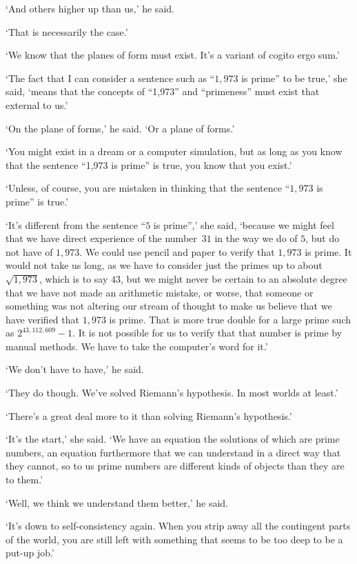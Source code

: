 `And others higher up than us,' he said.

`That is necessarily the case.'

`We know that the planes of form must exist. It's a variant of {\twelveit cogito ergo sum}.'

`The fact that I can consider a sentence such as ``$1,973$ is prime'' to be true,' she said, `means that the concepts of ``1,973'' and ``primeness'' must exist that external to us.'

`On the plane of forms,' he said. `Or {\twelveit a\/} plane of forms.'

`You might exist in a dream or a computer simulation, but as long as you {\twelveit know\/} that the sentence ``1,973 is prime'' is true, you {\twelveit know\/} that you exist.'

`Unless, of course, you are mistaken in thinking that the sentence ``$1,973$ is prime'' is true.'

`It's different from the sentence ``$5$ is prime'',' she said, `because we might feel that we have direct experience of the number~$31$ in the way we do of $5$, but do not have of $1,973$. We could use pencil and paper to verify that $1,973$ is prime. It would not take us long, as we have to consider just the primes up to about $\sqrt{1,973}$, which is to say $43$, but we might never be certain to an {\twelveit absolute\/} degree that we have not made an arithmetic mistake, or worse, that someone or something was not altering our stream of thought to make us believe that we have verified that $1,973$ is prime. That is more true double for a large prime such as $2^{43,112,609} − 1$. It is not possible for us to verify that that number is prime by manual methods. We have to take the computer's word for it.'

`{\twelveit We\/} don't have to have,' he said.

`They do though. We've solved Riemann's hypothesis. In most worlds at least.'

`There's a great deal more to it than solving Riemann's hypothesis.'

`It's the start,' she said. `We have an equation the solutions of which are prime numbers, an equation furthermore that {\twelveit we\/} can understand in a direct way that they cannot, so to us prime numbers are different kinds of objects than they are to them.'

`Well, we {\twelveit think\/} we understand them better,' he said.

`It's down to self-consistency again. When you strip away all the contingent parts of the world, you are still left with something that seems to be too deep to be a put-up job.'

